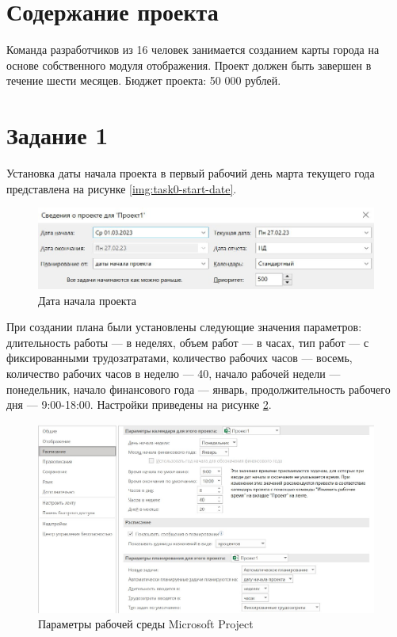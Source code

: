 \section*{Содержание проекта}

Команда разработчиков из 16 человек занимается созданием карты города на основе собственного модуля отображения. Проект должен быть завершен в течение шести месяцев. Бюджет проекта: 50 000 рублей.

\section*{Задание 1}

Установка даты начала проекта в первый рабочий день марта текущего года представлена на рисунке \ref{img:task0-start-date}.

\begin{figure}[H]
	\begin{center}
		\includegraphics[scale=0.42]{inc/img/task1-start-date.jpg}
	\end{center}
	\captionsetup{justification=centering}
	\caption{Дата начала проекта}
	\label{img:task1-start-date}
\end{figure}

При создании плана были установлены следующие значения параметров: длительность работы --- в неделях, объем работ --- в часах, тип работ --- с фиксированными трудозатратами, количество рабочих часов --- восемь, количество рабочих часов в неделю --- 40, начало рабочей недели --- понедельник, начало финансового года --- январь, продолжительность рабочего дня --- 9:00-18:00. Настройки приведены на рисунке \ref{img:task1-settings}.

\begin{figure}[H]
	\begin{center}
		\includegraphics[scale=0.4]{inc/img/task1-settings.jpg}
	\end{center}
	\captionsetup{justification=centering}
	\caption{Параметры рабочей среды Microsoft Project}
	\label{img:task1-settings}
\end{figure}

